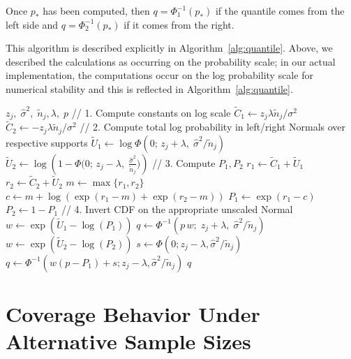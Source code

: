 Once $p_*$ has been computed, then $q = \Phi_1^{-1}(p_*)$ if the quantile comes from the left side and $q = \Phi_2^{-1}(p_*)$ if it comes from the right.

This algorithm is described explicitly in Algorithm~\ref{alg:quantile}. Above, we described the calculations as occurring on the probability scale; in our actual implementation, the computations occur on the log probability scale for numerical stability and this is reflected in Algorithm~\ref{alg:quantile}.

\begin{algorithm}
  \caption{Compute Quantile for Laplace-Normal Distribution}
  \label{alg:quantile}
  \begin{algorithmic}[1]
    \Require
    $z_j,\;\hat{\sigma}^2,\;\tilde{n}_j,\lambda,\;p$ 
    \Statex
    \State // 1. Compute constants on log scale
    \State $\tilde{C}_{1} \gets z_j \lambda \tilde{n}_j/\sigma^2$
    \State $\tilde{C}_{2} \gets -z_j \lambda \tilde{n}_j/\sigma^2$
    \Statex
    \State // 2. Compute total log probability in left/right Normals over respective supports
    \State $\tilde{U}_{1} \gets \log \Phi(0; \, z_j + \lambda,\; \hat{\sigma}^2 / \tilde{n}_j)$
    \State $\tilde{U}_{2} \gets \log \left(1 - \Phi\bigl(0;\,z_j - \lambda,\;\tfrac{\hat{\sigma}^2}{\tilde{n}_j}\bigr)\right)$
    \Statex
    \State // 3. Compute $P_{1}, P_{2}$
    \State $r_{1} \gets \tilde{C}_{1} + \tilde{U}_{1}$
    \State $r_{2} \gets \tilde{C}_{2} + \tilde{U}_{2}$
    \State $m \gets \max \lbrace r_{1}, r_{2} \rbrace$
    \State $c \gets m + \log\left(\exp(r_{1} - m) + \exp(r_{2} - m)\right)$
    \State $P_{1} \gets \exp(r_{1} - c)$
    \State $P_{2} \gets 1 - P_{1}$
    \Statex
    \State // 4. Invert CDF on the appropriate unscaled Normal
    \State $w \gets \exp(\tilde{U}_{1} - \log(P_{1}))$ 
    \State $q \gets \Phi^{-1}(p \,w;\;z_j + \lambda, \; \hat{\sigma}^2 / \tilde{n}_j)$
    \Else
    \State $w \gets \exp(\tilde{U}_{2} - \log(P_{2}))$
    \State $s \gets \Phi(0; z_j - \lambda, \hat{\sigma}^2 / \tilde{n}_j)$
    \State $q \gets \Phi^{-1}\!(w(p - P_{1}) + s;z_j - \lambda, \hat{\sigma}^2 / \tilde{n}_j)$
    \EndIf
    \State \Return $q$
  \end{algorithmic}
\end{algorithm}

\clearpage

\section{Coverage Behavior Under Alternative Sample Sizes}\label{sup:alt_ns}

